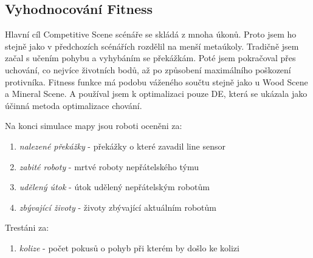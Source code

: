 \subsection*{Vyhodnocování Fitness}
Hlavní cíl Competitive Scene scénáře se skládá z mnoha úkonů. Proto jsem ho stejně jako v předchozích scénářích rozdělil na menší metaúkoly. Tradičně jsem začal s učením pohybu a vyhybáním se překážkám. Poté jsem pokračoval přes uchování, co nejvíce životních bodů, až po způsobení maximálního poškození protivníka. Fitness funkce má podobu váženého součtu stejně jako u Wood Scene a Mineral Scene. A používal jsem k optimalizaci pouze DE, která se ukázala jako účinná metoda optimalizace chování. 
\par 
Na konci simulace mapy jsou roboti oceněni za:  
\begin{enumerate}
	\item \textit{nalezené překážky} - překážky o které zavadil line sensor
	\item \textit{zabité roboty} - mrtvé roboty nepřátelského týmu
	\item \textit{udělený útok} - útok udělený nepřátelským robotům 
	\item \textit{zbývající životy} - životy zbývající aktuálním robotům
\end{enumerate}
Trestáni za:
\begin{enumerate}
	\item \textit{kolize} - počet pokusů o pohyb při kterém by došlo ke kolizi 
\end{enumerate}

